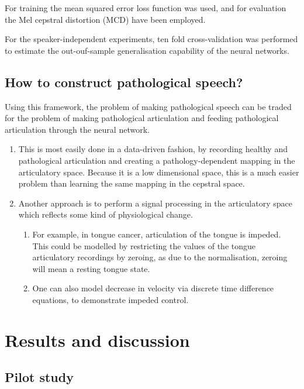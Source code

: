 \documentclass[a4paper]{article}
\begin{document}
For training the mean squared error loss function was used, and for
evaluation the Mel cepstral distortion (MCD) have been employed. \cite{Kubichek1993}

For the speaker-independent experiments, ten fold cross-validation was performed
to estimate the out-ouf-sample generalisation capability of the neural networks.

\subsection{How to construct pathological speech?} \label{section:speech}

Using this framework, the problem of making pathological speech
can be traded for the problem of making pathological articulation and
feeding pathological articulation through the neural network.

\begin{enumerate}
\item This is most easily done in a data-driven fashion, by recording healthy
  and pathological articulation and creating a pathology-dependent mapping
  in the articulatory space. Because it is a low dimensional space, this
  is a much easier problem than learning the same mapping in the cepstral
  space.
\item Another approach is to perform a signal processing in the articulatory
  space which reflects some kind of physiological change.
  \begin{enumerate}
  \item For example, in tongue cancer, articulation of the tongue is impeded.
    This could be modelled by restricting the values of the
    tongue articulatory recordings by zeroing, as due to the normalisation,
    zeroing will mean a resting tongue state.
  \item One can also model decrease in velocity via discrete time difference
    equations, to demonstrate impeded control.
    \end{enumerate}
\end{enumerate}


\section{Results and discussion}

\subsection{Pilot study}
\end{document}
